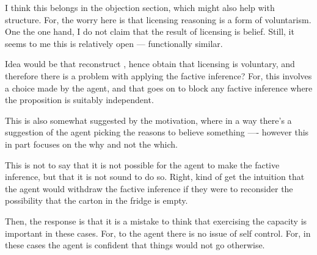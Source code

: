\documentclass[10pt]{article}
\begin{document}
\begin{note}[Grr]
  I think this belongs in the objection section, which might also help with structure.
  For, the worry here is that licensing reasoning is a form of voluntarism.
  One the one hand, I do not claim that the result of licensing is belief.
  Still, it seems to me this is relatively open --- functionally similar.

  Idea would be that reconstruct \citeauthor{Weatherson:2008uq}, hence obtain that licensing is voluntary, and therefore there is a problem with applying the factive inference?
  For, this involves a choice made by the agent, and that goes on to block any factive inference where the proposition is suitably independent.

  This is also somewhat suggested by the \citeauthor{Davidson:2001aa} motivation, where in a way there's a suggestion of the agent picking the reasons to believe something ---- however this in part focuses on the why and not the which.

  This is not to say that it is not possible for the agent to make the factive inference, but that it is not sound to do so.
  Right, kind of get the intuition that the agent would withdraw the factive inference if they were to reconsider the possibility that the carton in the fridge is empty.

  Then, the response is that it is a mistake to think that exercising the capacity is important in these cases.
  For, to the agent there is no issue of self control.
  For, in these cases the agent is confident that things would not go otherwise.
\end{note}
\end{document}
